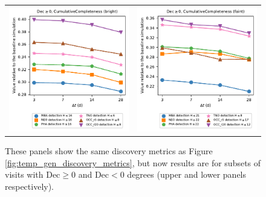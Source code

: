 \documentclass[preprintm,linenumbers]{aastex631}
\begin{document}
\begin{figure}
\begin{tabular}{@{}c@{}c@{}}
    				\includegraphics{results/one_snap_v4_0_n_visits_4_Dec_gtreq_0_discovery_metric_bright.pdf} &
				\includegraphics{results/one_snap_v4_0_n_visits_4_Dec_gtreq_0_discovery_metric_faint.pdf}
			\end{tabular}
			\caption{These panels show the same discovery metrics as Figure \protect\ref{fig:temp_gen_discovery_metrics}, but now results are for subsets of visits with Dec$\geq0$ and Dec$<0$ degrees (upper and lower panels respectively). 
			}
			\label{fig:temp_gen_discovery_metrics_dec}
		\end{figure}
		
\end{document}
